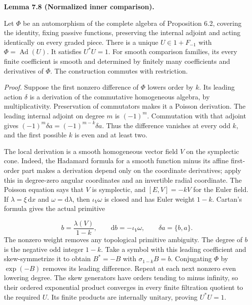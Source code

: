 \documentclass[
  english,
  11pt,
  reqno]{amsart}
\makeatletter
\newcommand{\pandocstatementheading}[1]{%
  \par\addpenalty{\@beginparpenalty}%
  \addvspace{.5\baselineskip plus .2\baselineskip minus .2\baselineskip}%
  {\normalfont\bfseries #1\par}%
  \nobreak\@afterindenttrue\@afterheading
}
\makeatother
\begin{document}
\pandocstatementheading{\leavevmode{}\label{lem:online-normalized-inner-rigidity}Lemma 7.8 (Normalized inner comparison).}

Let \(\Phi\) be an automorphism of the complete algebra of Proposition
6.2, covering the identity, fixing passive functions, preserving the
internal adjoint and acting identically on every graded piece. There is
a unique \(U\in1+F_{-1}\) with \(\Phi=\operatorname{Ad}(U)\). It
satisfies \(U^*U=1\). For smooth comparison families, its every finite
coefficient is smooth and determined by finitely many coefficients and
derivatives of \(\Phi\). The construction commutes with restriction.

\emph{Proof.} Suppose the first nonzero difference of \(\Phi\) lowers
order by \(k\). Its leading action \(\delta\) is a derivation of the
commutative homogeneous algebra, by multiplicativity. Preservation of
commutators makes it a Poisson derivation. The leading internal adjoint
on degree \(m\) is \((-1)^m\). Commutation with that adjoint gives
\((-1)^m\delta a=(-1)^{m-k}\delta a\). Thus the difference vanishes at
every odd \(k\), and the first possible \(k\) is even and at least two.

The local derivation is a smooth homogeneous vector field \(V\) on the
symplectic cone. Indeed, the Hadamard formula for a smooth function
minus its affine first-order part makes a derivation depend only on the
coordinate derivatives; apply this in degree-zero angular coordinates
and an invertible radial coordinate. The Poisson equation says that
\(V\) is symplectic, and \([E,V]=-kV\) for the Euler field. If
\(\lambda=\xi\,\mathrm dx\) and \(\omega=\mathrm d\lambda\), then
\(\iota_V\omega\) is closed and has Euler weight \(1-k\). Cartan's
formula gives the actual primitive

\label{eq:online-negative-weight-inner-primitive} \[
b=\frac{\lambda(V)}{1-k},\qquad
\mathrm db=-\iota_V\omega,\qquad
\delta a=\{b,a\}.
\] The nonzero weight removes any topological primitive ambiguity. The
degree of \(b\) is the negative odd integer \(1-k\). Take a symbol with
this leading coefficient and skew-symmetrize it to obtain \(B^*=-B\)
with \(\sigma_{1-k}B=b\). Conjugating \(\Phi\) by \(\exp(-B)\) removes
its leading difference. Repeat at each next nonzero even lowering
degree. The skew generators have orders tending to minus infinity, so
their ordered exponential product converges in every finite filtration
quotient to the required \(U\). Its finite products are internally
unitary, proving \(U^*U=1\).
\end{document}
